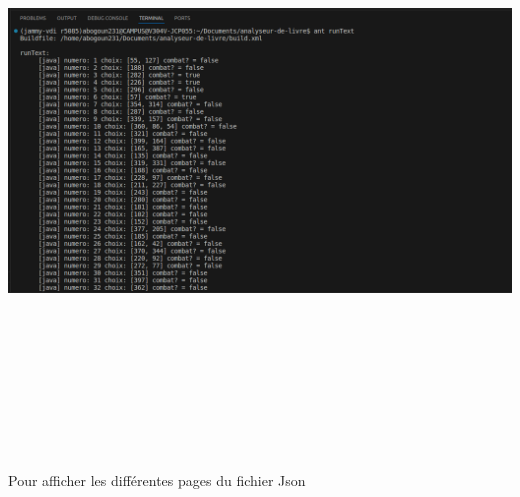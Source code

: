 \documentclass[12pt]{article}
\begin{document}
\includegraphics[width=16cm,height=16cm]{images/text.png}

Pour afficher les différentes pages du fichier Json
\end{document}
